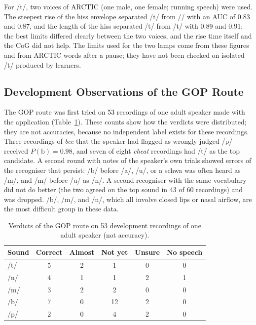 \documentclass[conference]{IEEEtran}
\newcommand{\ipa}[1]{/#1/}
\begin{document}
For \ipa{t\textesh}, two voices of ARCTIC (one male, one female; running speech) were used. The steepest rise of the hiss envelope separated \ipa{t\textesh} from \ipa{\textesh} with an AUC of 0.83 and 0.87, and the length of the hiss separated \ipa{t\textesh} from \ipa{t} with 0.89 and 0.91; the best limits differed clearly between the two voices, and the rise time itself and the CoG did not help. The limits used for the two lamps come from these figures and from ARCTIC words after a pause; they have not been checked on isolated \ipa{t\textesh} produced by learners.

\subsection{Development Observations of the GOP Route}
The GOP route was first tried on 53 recordings of one adult speaker made with the application (Table~\ref{tab:gop}). These counts show how the verdicts were distributed; they are not accuracies, because no independent label exists for these recordings. Three recordings of \textit{bee} that the speaker had flagged as wrongly judged \ipa{p} received $P(\mathrm{b})=0.98$, and seven of eight \textit{cheat} recordings had \ipa{t\textesh} as the top candidate. A second round with notes of the speaker's own trials showed errors of the recogniser that persist: \ipa{b} before \ipa{a}, \ipa{u}, or a schwa was often heard as \ipa{m}, and \ipa{m} before \ipa{u} as \ipa{n}. A second recogniser with the same vocabulary did not do better (the two agreed on the top sound in 43 of 60 recordings) and was dropped. \ipa{b}, \ipa{m}, and \ipa{n}, which all involve closed lips or nasal airflow, are the most difficult group in these data.

\begin{table}[!htb]
\caption{Verdicts of the GOP route on 53 development recordings of one adult speaker (not accuracy).}
\label{tab:gop}
\centering
\small
\begin{tabular}{lccccc}
\toprule
Sound & Correct & Almost & Not yet & Unsure & No speech \\
\midrule
\ipa{t\textesh} & 5 & 2 & 1 & 0 & 0 \\
\ipa{n} & 4 & 1 & 1 & 2 & 1 \\
\ipa{m} & 3 & 2 & 2 & 0 & 0 \\
\ipa{b} & 7 & 0 & 12 & 2 & 0 \\
\ipa{p} & 2 & 0 & 4 & 2 & 0 \\
\bottomrule
\end{tabular}
\end{table}
\end{document}

